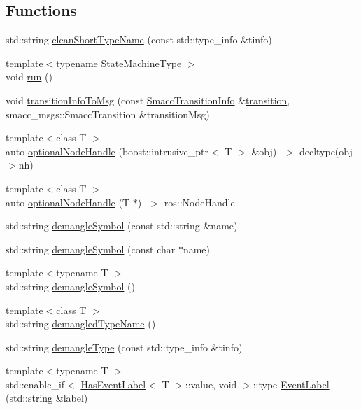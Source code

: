 \subsection*{Functions}
\begin{DoxyCompactItemize}
\item 
std\+::string \hyperlink{namespacesmacc_a09b297b1cdb9aae93a958f323431464a}{clean\+Short\+Type\+Name} (const std\+::type\+\_\+info \&tinfo)
\item 
{\footnotesize template$<$typename State\+Machine\+Type $>$ }\\void \hyperlink{namespacesmacc_a47ac3b8d2968b1ba4152afd64ab66bd0}{run} ()
\item 
void \hyperlink{namespacesmacc_a6cda75a51f4a5e29d0a64effb800fb61}{transition\+Info\+To\+Msg} (const \hyperlink{structsmacc_1_1SmaccTransitionInfo}{Smacc\+Transition\+Info} \&\hyperlink{classsmacc_1_1transition}{transition}, smacc\+\_\+msgs\+::\+Smacc\+Transition \&transition\+Msg)
\item 
{\footnotesize template$<$class T $>$ }\\auto \hyperlink{namespacesmacc_aaf5c46d2834edc391571efd0acd05e6f}{optional\+Node\+Handle} (boost\+::intrusive\+\_\+ptr$<$ T $>$ \&obj) -\/$>$ decltype(obj-\/$>$nh)
\item 
{\footnotesize template$<$class T $>$ }\\auto \hyperlink{namespacesmacc_aae43df8cb9ee66ed75e049cb8a7db33c}{optional\+Node\+Handle} (T $\ast$) -\/$>$ ros\+::\+Node\+Handle
\item 
std\+::string \hyperlink{namespacesmacc_a458f5e70d468824fbcd66cc7729deaa8}{demangle\+Symbol} (const std\+::string \&name)
\item 
std\+::string \hyperlink{namespacesmacc_a0b2684b209c8ebb043e0cff3800cc299}{demangle\+Symbol} (const char $\ast$name)
\item 
{\footnotesize template$<$typename T $>$ }\\std\+::string \hyperlink{namespacesmacc_a4dd421d5d4e7617fcf4a9a756797adda}{demangle\+Symbol} ()
\item 
{\footnotesize template$<$class T $>$ }\\std\+::string \hyperlink{namespacesmacc_a78b16538b666c48efe324eec61cc15d7}{demangled\+Type\+Name} ()
\item 
std\+::string \hyperlink{namespacesmacc_a792e7a3ea0843e87543a465b446ae730}{demangle\+Type} (const std\+::type\+\_\+info \&tinfo)
\item 
{\footnotesize template$<$typename T $>$ }\\std\+::enable\+\_\+if$<$ \hyperlink{classsmacc_1_1HasEventLabel}{Has\+Event\+Label}$<$ T $>$\+::value, void $>$\+::type \hyperlink{namespacesmacc_a718cd7f34605a7d59777341924cbfe7e}{Event\+Label} (std\+::string \&label)

\end{DoxyCompactItemize}
